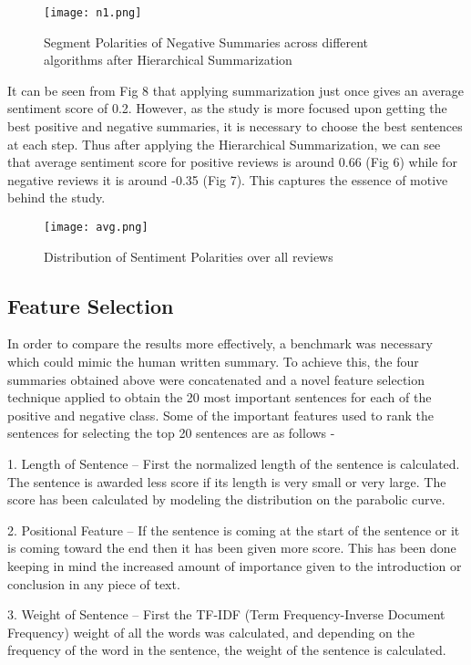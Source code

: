 \documentclass[conference]{IEEEtran}
\begin{document}
\begin{figure}[h!]
  \texttt{[image: n1.png]}
  \caption{Segment Polarities of Negative Summaries across different algorithms after Hierarchical Summarization}
  \label{fig:boat1}
\end{figure}

It can be seen from Fig 8 that applying summarization just once gives an average sentiment score of 0.2.  However, as the study is more focused upon getting the best positive and negative summaries, it is necessary to choose the best sentences at each step. Thus after applying the Hierarchical Summarization, we can see that average sentiment score for positive reviews is around 0.66 (Fig 6) while for negative reviews it is around -0.35 (Fig 7). This captures the essence of motive behind the study.

\begin{figure}[h!]
  \texttt{[image: avg.png]}
  \caption{Distribution of Sentiment Polarities over all reviews}
  \label{fig:boat1}
\end{figure}

\subsection{Feature Selection}
In order to compare the results more effectively, a benchmark was necessary which could mimic the human written summary. To achieve this, the four summaries obtained above were concatenated and a novel feature selection technique applied to obtain the 20 most important sentences for each of the positive and negative class. Some of the important features used to rank the sentences for selecting the top 20 sentences are as follows -

1. Length of Sentence – First the normalized length of the sentence is calculated. The sentence is awarded less score if its length is very small or very large. The score has been calculated by modeling the distribution on the parabolic curve. 

2. Positional Feature – If the sentence is coming at the start of the sentence or it is coming toward the end then it has been given more score. This has been done keeping in mind the increased amount of importance given to the introduction or conclusion in any piece of text. 

3. Weight of Sentence – First the TF-IDF (Term Frequency-Inverse Document Frequency) weight of all the words was calculated, and depending on the frequency of the word in the sentence, the weight of the sentence is calculated.
\end{document}
